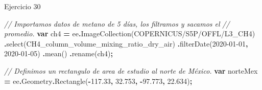 \documentclass[
  12pt,
  letterpaper,
  twoside]{book}
\newenvironment{Shaded}{\begin{snugshade}}{\end{snugshade}}
\newcommand{\AttributeTok}[1]{\textcolor[rgb]{0.77,0.63,0.00}{#1}}
\newcommand{\CommentTok}[1]{\textcolor[rgb]{0.56,0.35,0.01}{\textit{#1}}}
\newcommand{\FloatTok}[1]{\textcolor[rgb]{0.00,0.00,0.81}{#1}}
\newcommand{\FunctionTok}[1]{\textcolor[rgb]{0.00,0.00,0.00}{#1}}
\newcommand{\KeywordTok}[1]{\textcolor[rgb]{0.13,0.29,0.53}{\textbf{#1}}}
\newcommand{\NormalTok}[1]{#1}
\newcommand{\OperatorTok}[1]{\textcolor[rgb]{0.81,0.36,0.00}{\textbf{#1}}}
\newcommand{\StringTok}[1]{\textcolor[rgb]{0.31,0.60,0.02}{#1}}
\begin{document}
Ejercicio 30

\begin{Shaded}
\begin{Highlighting}[]
\CommentTok{// Importamos datos de metano de 5 días, los filtramos y sacamos el }
\CommentTok{// promedio.}
\KeywordTok{var}\NormalTok{ ch4 }\OperatorTok{=}\NormalTok{ ee}\OperatorTok{.}\FunctionTok{ImageCollection}\NormalTok{(}\StringTok{\textquotesingle{}COPERNICUS/S5P/OFFL/L3\_CH4\textquotesingle{}}\NormalTok{)}
  \OperatorTok{.}\FunctionTok{select}\NormalTok{(}\StringTok{\textquotesingle{}CH4\_column\_volume\_mixing\_ratio\_dry\_air\textquotesingle{}}\NormalTok{)}
  \OperatorTok{.}\FunctionTok{filterDate}\NormalTok{(}\StringTok{\textquotesingle{}2020{-}01{-}01\textquotesingle{}}\OperatorTok{,} \StringTok{\textquotesingle{}2020{-}01{-}05\textquotesingle{}}\NormalTok{)}
  \OperatorTok{.}\FunctionTok{mean}\NormalTok{()}
  \OperatorTok{.}\FunctionTok{rename}\NormalTok{(}\StringTok{\textquotesingle{}ch4\textquotesingle{}}\NormalTok{)}\OperatorTok{;}

\CommentTok{// Definimos un rectangulo de area de estudio al norte de México.}
\KeywordTok{var}\NormalTok{ norteMex }\OperatorTok{=}
\NormalTok{  ee}\OperatorTok{.}\AttributeTok{Geometry}\OperatorTok{.}\FunctionTok{Rectangle}\NormalTok{(}\OperatorTok{{-}}\FloatTok{117.33}\OperatorTok{,} \FloatTok{32.753}\OperatorTok{,} \OperatorTok{{-}}\FloatTok{97.773}\OperatorTok{,} \FloatTok{22.634}\NormalTok{)}\OperatorTok{;}


\end{Highlighting}
\end{Shaded}
\end{document}
